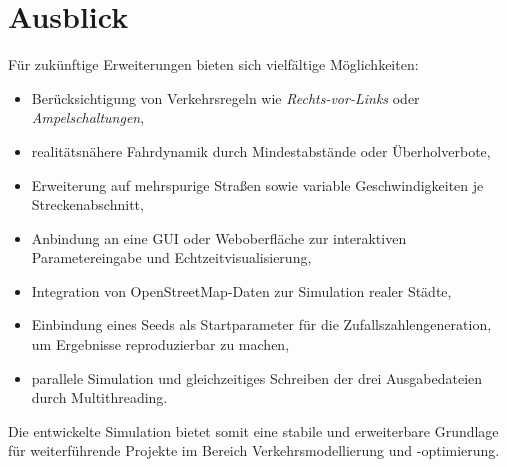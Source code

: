 \documentclass[a4paper,12pt]{report}
\begin{document}
\section*{Ausblick}

Für zukünftige Erweiterungen bieten sich vielfältige Möglichkeiten:
\begin{itemize}
    \item Berücksichtigung von Verkehrsregeln wie \emph{Rechts-vor-Links} oder \emph{Ampelschaltungen},
    \item realitätsnähere Fahrdynamik durch Mindestabstände oder Überholverbote,
    \item Erweiterung auf mehrspurige Straßen sowie variable Geschwindigkeiten je Streckenabschnitt,
    \item Anbindung an eine GUI oder Weboberfläche zur interaktiven Parametereingabe und Echtzeitvisualisierung,
    \item Integration von OpenStreetMap-Daten zur Simulation realer Städte,
    \item Einbindung eines Seeds als Startparameter für die Zufallszahlengeneration, um Ergebnisse reproduzierbar zu machen,
    \item parallele Simulation und gleichzeitiges Schreiben der drei Ausgabedateien durch Multithreading.
\end{itemize}

Die entwickelte Simulation bietet somit eine stabile und erweiterbare Grundlage für weiterführende Projekte im Bereich Verkehrsmodellierung und -optimierung.
\end{document}
